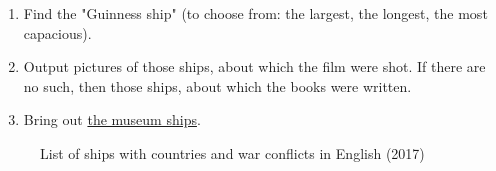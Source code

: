 \begin{enumerate}
  \item Find the "Guinness ship" (to choose from: the largest, the longest, the most capacious).
  \item Output pictures of those ships, about which the film were shot. If there are no such, then those ships, about which the books were written.
  \item Bring out \href{https://en.wikipedia.org/wiki/List_of_museum_ships}{the museum ships}.
\end{enumerate}



\begin{figure*}[ht]
  {
  \setlength{\fboxsep}{0pt}%
  \setlength{\fboxrule}{1pt}%
  }
    \caption{List of ships with countries and war conflicts in English (2017)}%
    \label{fig:ships_by_country_and_conflict}%
\end{figure*}
\contentsline